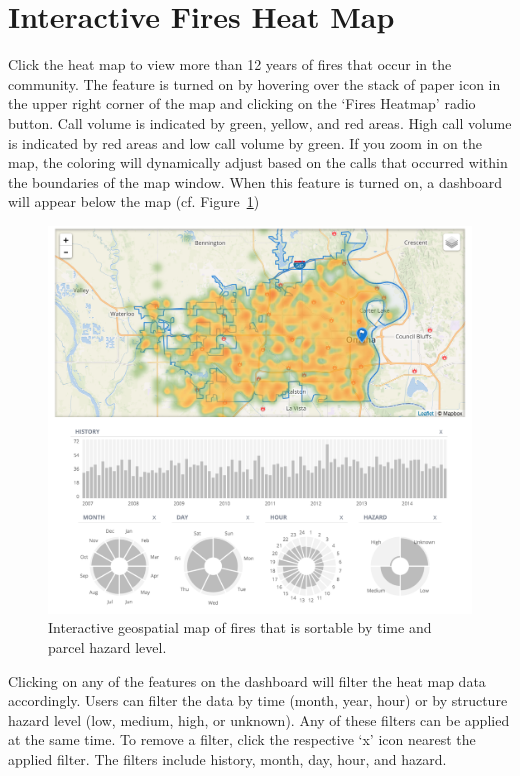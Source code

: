 \documentclass[12pt,oneside]{book}
\begin{document}
\FloatBarrier

\section{Interactive Fires Heat Map}

Click the heat map to view more than 12 years of fires that occur in the community. The feature is turned on by hovering over the stack of paper icon in the upper right corner of the map and clicking on the `Fires Heatmap' radio button. Call volume is indicated by green, yellow, and red areas. High call volume is indicated by red areas and low call volume by green. If you zoom in on the map, the coloring will dynamically adjust based on the calls that occurred within the boundaries of the map window. When this feature is turned on, a dashboard will appear below the map (cf. Figure~\ref{fig:interactive_fire_map})

\begin{figure}[ht!]
\centering
\includegraphics[width=.9\columnwidth]{Figures/interactive_fire_map}
\caption{Interactive geospatial map of fires that is sortable by time and parcel hazard level.}
\label{fig:interactive_fire_map}
\end{figure}

Clicking on any of the features on the dashboard will filter the heat map data accordingly. Users can filter the data by time (month, year, hour) or by structure hazard level (low, medium, high, or unknown). Any of these filters can be applied at the same time. To remove a filter, click the respective `x' icon nearest the applied filter. The filters include history, month, day, hour, and hazard.
\end{document}
